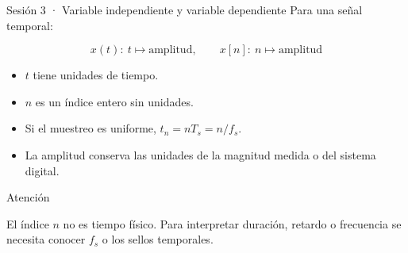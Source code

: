 \documentclass[
  10pt,
  ignorenonframetext,
  aspectratio=169,
  spanish,
]{beamer}
\providecommand{\tightlist}{%
  \setlength{\itemsep}{0pt}\setlength{\parskip}{0pt}}
\begin{document}
\begin{frame}{Sesión 3 · Variable independiente y variable dependiente}
\label{d1-026}
Para una señal temporal:

\[x(t):\ t\mapsto\text{amplitud},\qquad x[n]:\ n\mapsto\text{amplitud}\]

\begin{itemize}
\tightlist
\item
  \(t\) tiene unidades de tiempo.
\item
  \(n\) es un índice entero sin unidades.
\item
  Si el muestreo es uniforme, \(t_n=nT_s=n/f_s\).
\item
  La amplitud conserva las unidades de la magnitud medida o del sistema
  digital.
\end{itemize}

\begin{alertblock}{Atención}

El índice \(n\) no es tiempo físico. Para interpretar duración, retardo
o frecuencia se necesita conocer \(f_s\) o los sellos temporales.

\end{alertblock}

\end{frame}
\end{document}
